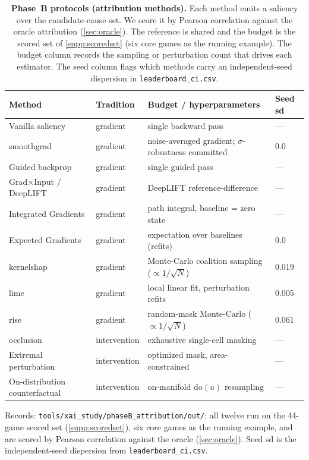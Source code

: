 \begin{table}[t]
\centering
\caption{\textbf{Phase~B protocols (attribution methods).} Each method emits a saliency over
the candidate-cause set. We score it by Pearson correlation against the oracle attribution
(\Sectionname\ref{sec:oracle}). The reference is shared and the budget is the scored set of
\Sectionname\ref{supp:scoredset} (six core games as the running example). The budget column records the
sampling or perturbation count that drives each estimator. The seed column flags which
methods carry an independent-seed dispersion in \texttt{leaderboard\_ci.csv}.}
\label{supp:tab:phaseB}
\scriptsize
\setlength{\tabcolsep}{4pt}
\begin{tabular}{@{}p{2.9cm}p{1.75cm}p{4.3cm}p{1.15cm}@{}}
\toprule
Method & Tradition & Budget / hyperparameters & Seed sd \\
\midrule
Vanilla saliency & gradient & single backward pass & --- \\
smoothgrad & gradient & noise-averaged gradient; $\sigma$-robustness committed & 0.0 \\
Guided backprop & gradient & single guided pass & --- \\
Grad$\times$Input / DeepLIFT & gradient & DeepLIFT reference-difference & --- \\
Integrated Gradients & gradient & path integral, baseline = zero state & --- \\
Expected Gradients & gradient & expectation over baselines (refits) & 0.0 \\
kernelshap & gradient & Monte-Carlo coalition sampling ($\propto 1/\sqrt{N}$) & 0.019 \\
lime & gradient & local linear fit, perturbation refits & 0.005 \\
rise & gradient & random-mask Monte-Carlo ($\propto 1/\sqrt{N}$) & 0.061 \\
occlusion & intervention & exhaustive single-cell masking & --- \\
Extremal perturbation & intervention & optimized mask, area-constrained & --- \\
On-distribution counterfactual & intervention & on-manifold $\mathrm{do}(u)$ resampling & --- \\
\bottomrule
\end{tabular}

\smallskip
\noindent\scriptsize Records: \texttt{tools/xai\_study/phaseB\_attribution/out/}; all twelve run
on the 44-game scored set (\Sectionname\ref{supp:scoredset}), six core games as the running
example, and are scored by Pearson correlation against the oracle (\Sectionname\ref{sec:oracle}). Seed
sd is the independent-seed dispersion from \texttt{leaderboard\_ci.csv}.
\end{table}

